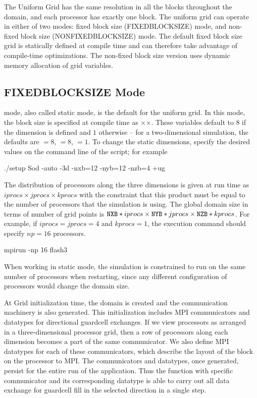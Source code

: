 The Uniform Grid has the same resolution in all the blocks throughout
the domain, and each processor has exactly one block.  The uniform
grid can operate in either of two modes: fixed block size
(FIXEDBLOCKSIZE) mode, and non-fixed block size (NONFIXEDBLOCKSIZE)
mode. The default fixed block size grid is statically defined at
compile time and can therefore take advantage of compile-time
optimizations. The non-fixed block size version uses dynamic memory
allocation of grid variables. 

\subsection{FIXEDBLOCKSIZE Mode} 
mode, also called
static mode, is the default for the uniform grid. In this mode, the
block size is specified at compile time as
$\times$$\times$. These variables
default to $8$ if the dimension is defined and $1$ otherwise -- \eg
for a two-dimensional simulation, the defaults are $=8$,
$=8$, $=1$. To change the static dimensions,
specify the desired values on the command line of the 
script; for example 
\begin{codeseg} 
./setup Sod -auto -3d -nxb=12 -nyb=12 -nzb=4 +ug
\end{codeseg} 
The distribution of processors along the three dimensions is given at 
run time as $iprocs\times jprocs\times kprocs$ with the constraint 
that this product must be equal to the number of processors that the 
simulation is using. The global domain size in terms of number of grid
points is ${\tt NXB}*iprocs \times {\tt NYB}*jprocs \times 
{\tt NZB}*kprocs$.  For example, if $iprocs=jprocs=4$ and $kprocs=1$,
the execution command should specify $np=16$ processors.
\begin{codeseg} 
mpirun -np 16 flash3 
\end{codeseg} 
When working in static mode, the simulation is constrained to run on 
the same number of processors when restarting, since any different 
configuration of processors would change the domain size. 

At Grid initialization time, the domain is created and the 
communication machinery is also generated. This initialization 
includes MPI communicators and datatypes for directional guardcell 
exchanges. If we view processors as arranged in a three-dimensional 
processor grid, then a row of processors along each dimension becomes 
a part of the same communicator. We also define MPI datatypes for each
of these communicators, which describe the layout of the block on the
processor to MPI. The communicators and datatypes, once generated, 
persist for the entire run of the application. Thus the 
 function with specific communicator and its 
corresponding datatype is able to carry out all data exchange for 
guardcell fill in the selected direction in a single step. 

